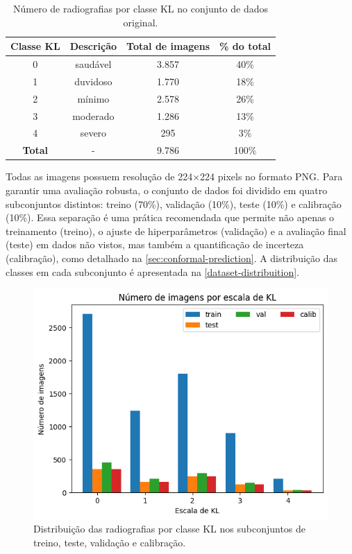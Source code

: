 \begin{table}[!htbp]
    \centering
    \begin{tabular}{|c|c|c|c|}
        \hline
        \textbf{Classe KL} & \textbf{Descrição} & \textbf{Total de imagens} & \textbf{\% do total} \\
        \hline
        0 & saudável & 3.857 & 40\% \\
        \hline
        1 & duvidoso & 1.770 & 18\% \\
        \hline
        2 & mínimo & 2.578 & 26\% \\
        \hline
        3 & moderado & 1.286 & 13\% \\
        \hline
        4 & severo & 295 & 3\% \\
        \hline
        \textbf{Total} & - & 9.786 & 100\% \\
        \hline
    \end{tabular}
    \caption{Número de radiografias por classe KL no conjunto de dados original.}
    \label{dataset-summary}
\end{table}

Todas as imagens possuem resolução de 224×224 pixels no formato PNG. Para garantir uma avaliação robusta, o conjunto de dados foi dividido em quatro subconjuntos distintos: treino (70\%), validação (10\%), teste (10\%) e calibração (10\%). Essa separação é uma prática recomendada que permite não apenas o treinamento (treino), o ajuste de hiperparâmetros (validação) e a avaliação final (teste) em dados não vistos, mas também a quantificação de incerteza (calibração), como detalhado na \autoref{sec:conformal-prediction}. A distribuição das classes em cada subconjunto é apresentada na \autoref{dataset-distribuition}.

\begin{figure}[!htbp]
    \centering
    \includegraphics[width=0.7\linewidth]{figs/dataset-class-distribution.png}
    \caption{Distribuição das radiografias por classe KL nos subconjuntos de treino, teste, validação e calibração.}
    \label{dataset-distribuition}
\end{figure}


